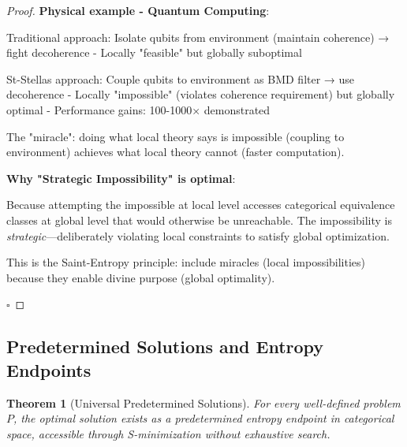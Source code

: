 \documentclass[12pt,a4paper]{article}
\newtheorem{theorem}{Theorem}[section]
\begin{document}
\begin{proof}
\textbf{Physical example - Quantum Computing}:

Traditional approach: Isolate qubits from environment (maintain coherence) → fight decoherence
- Locally "feasible" but globally suboptimal

St-Stellas approach: Couple qubits to environment as BMD filter → use decoherence
- Locally "impossible" (violates coherence requirement) but globally optimal
- Performance gains: 100-1000× demonstrated

The "miracle": doing what local theory says is impossible (coupling to environment) achieves what local theory cannot (faster computation).

\textbf{Why "Strategic Impossibility" is optimal}:

Because attempting the impossible at local level accesses categorical equivalence classes at global level that would otherwise be unreachable. The impossibility is \textit{strategic}—deliberately violating local constraints to satisfy global optimization.

This is the Saint-Entropy principle: include miracles (local impossibilities) because they enable divine purpose (global optimality).

$\square$
\end{proof}

\subsection{Predetermined Solutions and Entropy Endpoints}

\begin{theorem}[Universal Predetermined Solutions]
\label{thm:predetermined_solutions}
For every well-defined problem $P$, the optimal solution exists as a predetermined entropy endpoint in categorical space, accessible through S-minimization without exhaustive search.
\end{theorem}
\end{document}
